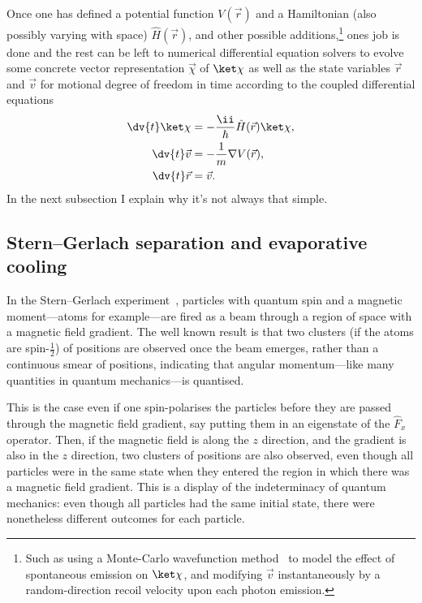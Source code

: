 Once one has defined a potential function $V(\vec r)$ and a Hamiltonian (also possibly varying with space) $\hat H(\vec r)$, and other possible additions,\footnote{Such as using a Monte-Carlo wavefunction method~\cite{Molmer:93, RevModPhys.70.101} to model the effect of spontaneous emission on $\ket\chi$, and modifying $\vec v$ instantaneously by a random-direction recoil velocity upon each photon emission.} ones job is done and the rest can be left to numerical differential equation solvers to evolve some concrete vector representation $\vec\chi$ of $\ket\chi$ as well as the state variables $\vec r$ and $\vec v$ for motional degree of freedom in time according to the coupled differential equations
\begin{align}\label{eq:simple_semiclassical_first}
\dv{t}\ket\chi &= -\frac\ii\hbar \hat H(\vec r)\ket\chi,\\
\dv{t}\vec v &= -\frac1m\nabla V(\vec r),\\
\dv{t}\vec r &= \vec v\label{eq:simple_semiclassical_last}.
\end{align}
In the next subsection I explain why it's not always that simple.

\subsection{Stern--Gerlach separation and evaporative cooling}

In the Stern--Gerlach experiment~\cite{gerlach_experimentelle_1922}, particles with quantum spin and a magnetic moment---atoms for example---are fired as a beam through a region of space with a magnetic field gradient. The well known result is that two clusters (if the atoms are spin-$\frac12$) of positions are observed once the beam emerges, rather than a continuous smear of positions, indicating that angular momentum---like many quantities in quantum mechanics---is quantised.

This is the case even if one spin-polarises the particles before they are passed through the magnetic field gradient, say putting them in an eigenstate of the $\hat F_x$ operator. Then, if the magnetic field is along the $z$ direction, and the gradient is also in the $z$ direction, two clusters of positions are also observed, even though all particles were in the same state when they entered the region in which there was a magnetic field gradient. This is a display of the indeterminacy of quantum mechanics: even though all particles had the same initial state, there were nonetheless different outcomes for each particle.

